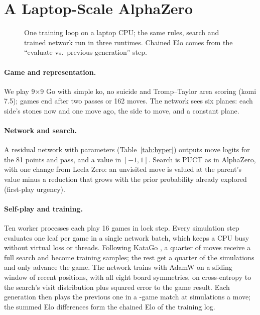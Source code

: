 \section{A Laptop-Scale AlphaZero}
\label{sec:system}
\begin{figure}[t]
\centering

\caption{One training loop on a laptop CPU; the same rules, search and trained network run in three
runtimes. Chained Elo comes from the ``evaluate vs.\ previous generation'' step.}
\label{fig:pipeline}
\end{figure}

\paragraph{Game and representation.}
We play 9$\times$9 Go with simple ko, no suicide and Tromp--Taylor area scoring (komi 7.5); games end
after two passes or 162 moves. The network sees six planes: each side's stones now and one move ago, the
side to move, and a constant plane.

\paragraph{Network and search.}
A residual network \citep{he2016resnet} with \valNParams{} parameters (Table~\ref{tab:hyper}) outputs move
logits for the 81 points and pass, and a value in $[-1,1]$. Search is PUCT \citep{rosin2011puct} as in
AlphaZero, with one change from Leela Zero: an unvisited move is valued at the parent's value minus a
reduction that grows with the prior probability already explored (first-play urgency).

\paragraph{Self-play and training.}
Ten worker processes each play 16 games in lock step. Every simulation step evaluates one leaf per game in
a single network batch, which keeps a CPU busy without virtual loss or threads. Following KataGo
\citep{wu2019katago}, a quarter of moves receive a full search and become training samples; the rest get a
quarter of the simulations and only advance the game. The network trains with AdamW on a sliding window
of recent positions, with all eight board symmetries, on cross-entropy to the search's visit distribution
plus squared error to the game result. Each generation then plays the previous one in a
\valEvalGames{}-game match at \valEvalSims{} simulations a move; the summed Elo differences form the
chained Elo of the training log.

